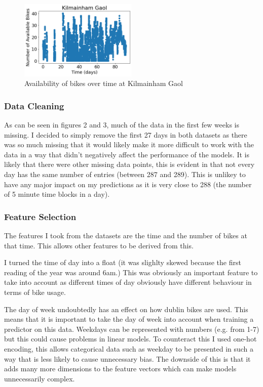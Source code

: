 \begin{figure}[H]
    \centering
    \includegraphics[width=0.5\textwidth]{images/kilmainham data.png}
    \caption{Availability of bikes over time at Kilmainham Gaol}
    \end{figure}
\par 



\subsubsection{Data Cleaning}
As can be seen in figures 2 and 3, much of the data in the first few weeks is missing.
I decided to simply remove the first 27 days in both datasets as 
there was so much missing that it would likely make it more difficult to 
work with the data in a way that didn't negatively affect the performance of the models.
It is likely that there were other missing data points, this is evident in that not every day has the same number of entries (between 287 and 289).
This is unlikey to have any major impact on my predictions as it is very close to 288
(the number of 5 minute time blocks in a day).

\subsubsection{Feature Selection}
The features I took from the datasets are the time and the number of bikes at that time.
This allows other features to be derived from this.
\par 
I turned the time of day into a float (it was slighlty skewed because the first reading of the year was around 6am.)
This was obviously an important feature to take into account as different times of day obviously have different behaviour in terms of bike usage.


\par
The day of week undoubtedly has an effect on how dublin bikes are used. 
This means that it is important to take the day of week into account when training a predictor on this data.
Weekdays can be represented with numbers (e.g. from 1-7) but this could cause problems in linear models.
To counteract this I used one-hot encoding, 
this allows categorical data such as weekday to be presented in such a way that is less likely to cause unnecessary bias.
The downside of this is that it adds many more dimensions to the feature vectors which can make models unnecessarily complex.

